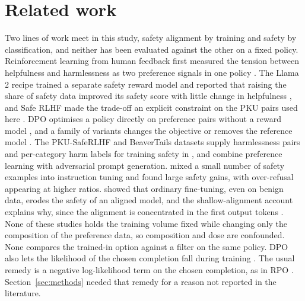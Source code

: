 \documentclass[10pt]{article} %
\begin{document}
\section{Related work}
\label{sec:related}
Two lines of work meet in this study, safety alignment by training and safety by classification, and neither has been evaluated against the other on a fixed policy. Reinforcement learning from human feedback first measured the tension between helpfulness and harmlessness as two preference signals in one policy \citep{bai2022hh}. The Llama 2 recipe trained a separate safety reward model and reported that raising the share of safety data improved its safety score with little change in helpfulness \citep{touvron2023llama2}, and Safe RLHF made the trade-off an explicit constraint on the PKU pairs used here \citep{dai2024saferlhf}. DPO optimises a policy directly on preference pairs without a reward model \citep{rafailov2023dpo}, and a family of variants changes the objective or removes the reference model \citep{azar2024ipo,hong2024orpo,xu2024cpo,gupta2024refa}. The PKU-SafeRLHF and BeaverTails datasets supply harmlessness pairs and per-category harm labels for training safety in \citep{ji2024pku,ji2023beavertails}, and \citet{wang2025adversarial} combine preference learning with adversarial prompt generation. \citet{bianchi2024safetytuned} mixed a small number of safety examples into instruction tuning and found large safety gains, with over-refusal appearing at higher ratios. \citet{qi2024finetuning} showed that ordinary fine-tuning, even on benign data, erodes the safety of an aligned model, and the shallow-alignment account explains why, since the alignment is concentrated in the first output tokens \citep{qi2025safety,li2026superficial}. None of these studies holds the training volume fixed while changing only the composition of the preference data, so composition and dose are confounded. None compares the trained-in option against a filter on the same policy. DPO also lets the likelihood of the chosen completion fall during training \citep{pal2024smaug,razin2025likelihooddisplacement}. The usual remedy is a negative log-likelihood term on the chosen completion, as in RPO \citep{pang2024irpo}. Section~\ref{sec:methods} needed that remedy for a reason not reported in the literature.
\end{document}

